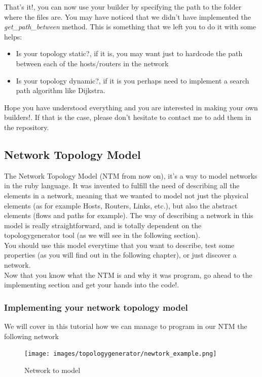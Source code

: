 That's it!, you can now use your builder by specifying the path to the folder where the files are. You may have noticed that we didn't have implemented the \textit{get\_path\_between} method. This is something that we left you to do it with some helps:
\begin{itemize}
\item Is your topology static?, if it is, you may want just to hardcode the path between each of the hosts/routers in the network
\item Is your topology dynamic?, if it is you perhaps need to implement a search path algorithm like Dijkstra.
\end{itemize}

Hope you have understood everything and you are interested in making your own builders!. If that is the case, please don't hesitate to contact me to add them in the repository.

\subsection{Network Topology Model}

The Network Topology Model (NTM from now on), it's a way to model networks in the ruby language. It was invented to fulfill the need of describing all the elements in a network, meaning that we wanted to model not just the physical elements (as for example Hosts, Routers, Links, etc.), but also the abstract elements (flows and paths for example). The way of describing a network in this model is really straightforward, and is totally dependent on the topologygenerator tool (as we will see in the following section). \\
You should use this model everytime that you want to describe, test some properties (as you will find out in the following chapter), or just discover a network. \\
Now that you know what the NTM is and why it was program, go ahead to the implementing section and get your hands into the code!.

\subsubsection{Implementing your network topology model}

We will cover in this tutorial how we can manage to program in our NTM the following network 

\begin{figure}[H]
\centering
\texttt{[image: images/topologygenerator/newtork\_example.png]}
\caption{Network to model}
\end{figure}

